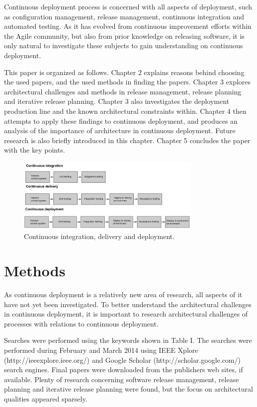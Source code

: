 \documentclass[conference]{IEEEtran}
\begin{document}
Continuous deployment process is concerned with all aspects of deployment, such as configuration management, release management, continuous integration and automated testing. As it has evolved from continuous improvement efforts within the Agile community, but also from prior knowledge on releasing software, it is only natural to investigate these subjects to gain understanding on continuous deployment.

This paper is organized as follows. Chapter 2 explains reasons behind choosing the used papers, and the used methods in finding the papers. Chapter 3 explores architectural challenges and methods in release management, release planning and iterative release planning. Chapter 3 also investigates the deployment production line and the known architectural constraints within. Chapter 4 then attempts to apply these findings to continuous deployment, and produces an analysis of the importance of architecture in continuous deployment. Future research is also briefly introduced in this chapter. Chapter 5 concludes the paper with the key points.  

\begin{figure}[!t]
	\centering
	\includegraphics[width=3.5in]{rtvd.jpg}
	\caption{Continuous integration, delivery and deployment.}
	\label{fig1}
\end{figure}

\section{Methods} %

As continuous deployment is a relatively new area of research, all aspects of it have not yet been investigated. To better understand the architectural challenges in continuous deployment, it is important to research architectural challenges of processes with relations to continuous deployment.

Searches were performed using the keywords shown in Table I. The searches were performed during February and March 2014 using IEEE Xplore (http://ieeexplore.ieee.org/‎) and Google Scholar (http://scholar.google.com/) search engines. Final papers were downloaded from the publishers web sites, if available. Plenty of research concerning software release management, release planning and iterative release planning were found, but the focus on architectural qualities appeared sparsely.  
\end{document}
